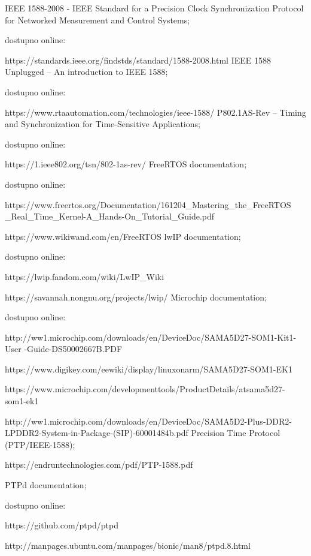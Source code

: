 \documentclass[a4paper,12pt, master]{etf}
\begin{document}
    \newpage

    \begin{thebibliography}{10}
         IEEE 1588-2008 - IEEE Standard for a Precision Clock
        Synchronization Protocol for Networked Measurement and Control Systems;

        dostupno online:

        https://standards.ieee.org/findstds/standard/1588-2008.html
         IEEE 1588 Unplugged – An introduction to IEEE 1588;

        dostupno online:

        https://www.rtaautomation.com/technologies/ieee-1588/
         P802.1AS-Rev – Timing and Synchronization for
        Time-Sensitive Applications;

        dostupno online:

        https://1.ieee802.org/tsn/802-1as-rev/
         FreeRTOS documentation;

        dostupno online:

        https://www.freertos.org/Documentation/161204\_Mastering\_the\_FreeRTOS
        \_Real\_Time\_Kernel-A\_Hands-On\_Tutorial\_Guide.pdf

        https://www.wikiwand.com/en/FreeRTOS
         lwIP documentation;

        dostupno online:

        https://lwip.fandom.com/wiki/LwIP\_Wiki

        https://savannah.nongnu.org/projects/lwip/
         Microchip documentation;

        dostupno online:

        http://ww1.microchip.com/downloads/en/DeviceDoc/SAMA5D27-SOM1-Kit1-User
        -Guide-DS50002667B.PDF

        https://www.digikey.com/eewiki/display/linuxonarm/SAMA5D27-SOM1-EK1

        https://www.microchip.com/developmenttools/ProductDetails/atsama5d27-
        som1-ek1

        http://ww1.microchip.com/downloads/en/DeviceDoc/SAMA5D2-Plus-DDR2-
        LPDDR2-System-in-Package-(SIP)-60001484b.pdf
         Precision Time Protocol (PTP/IEEE-1588);

        https://endruntechnologies.com/pdf/PTP-1588.pdf

         PTPd documentation;

        dostupno online:

        https://github.com/ptpd/ptpd

        http://manpages.ubuntu.com/manpages/bionic/man8/ptpd.8.html
    \end{thebibliography}
\end{document}
